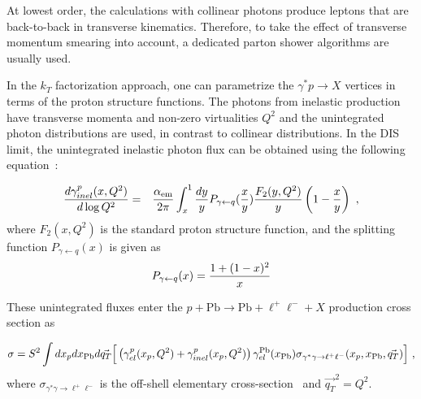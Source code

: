 At lowest order, the calculations with collinear photons  produce leptons that are back-to-back in transverse kinematics. 
Therefore, to take the effect of transverse momentum smearing into account, a dedicated parton shower algorithms are usually used.

In the $k_T$ factorization approach, one can parametrize the $\gamma^*p \rightarrow X$ vertices in terms of the proton structure functions. The photons from inelastic production have transverse momenta and non-zero virtualities $Q^2$ and the unintegrated photon distributions are used, in contrast to collinear distributions.
In the DIS limit, the unintegrated inelastic photon flux can be obtained using the following equation~\cite{daSilveira:2014jla, Luszczak:2015aoa}:

\begin{eqnarray}
{d \gamma^p_{inel}(x,Q^2) \over d \log Q^2} =&& {\alpha_{\rm{em}} \over 2 \pi} \int_x^1 {dy \over y} 
P_{\gamma \leftarrow q}({x\over y}) 
{F_2(y, Q^2) \over y} \left(1- {x\over y}\right)~,
\end{eqnarray}
where $F_2(x, Q^2)$ is the standard proton structure function, and the splitting function $P_{\gamma \leftarrow q}(x)$ is given as
\begin{eqnarray}
P_{\gamma \leftarrow q}(x) = {1+(1-x)^2 \over x}
\end{eqnarray}


These unintegrated fluxes enter the $p+\textrm{Pb}\rightarrow \textrm{Pb} + \ell^+\ell^- + X$ production cross section as

\begin{equation}
\sigma = S^2 \int dx_p dx_{\rm Pb} d\vec{q_T} \Big[
\left ( \gamma^{p}_{el}(x_p, Q^2) + \gamma^{p}_{inel}(x_p,Q^2) \right)
 \gamma^{\rm Pb}_{el}(x_{\rm Pb})
\sigma_{\gamma^{*}  \gamma \rightarrow \ell^+ \ell^-}(x_p, x_{\rm Pb}, \vec{q_T})  \Big]~,
\label{kt_factorization_formula}
\end{equation}
%
where $\sigma_{\gamma^{*} \gamma \rightarrow \ell^+ \ell^-}$ is the off-shell elementary cross-section~\cite{daSilveira:2014jla} and $\vec{q_T}^2 = Q^2$.
